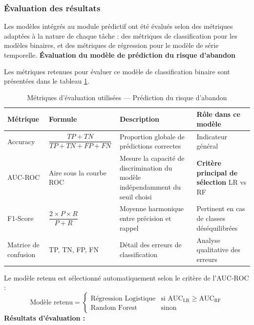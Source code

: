 \subsubsection{Évaluation des résultats}
Les modèles intégrés au module prédictif ont été évalués selon des métriques adaptées à la nature de chaque tâche : des métriques de classification pour les modèles binaires, et des métriques de régression pour le modèle de série temporelle.
\vspace{0.3cm}
\noindent\textbf{Évaluation du modèle de prédiction du risque d'abandon }

\noindent Les métriques retenues pour évaluer ce modèle de classification binaire sont présentées dans le tableau \ref{tab:metriques_abandon}.

\begin{table}[H]
\centering
\caption{Métriques d'évaluation utilisées — Prédiction du risque d'abandon}
\label{tab:metriques_abandon}
\begin{tabular}{|l|p{4cm}|p{4cm}|p{3.5cm}|}
\hline
\textbf{Métrique} & \textbf{Formule} & \textbf{Description} & \textbf{Rôle dans ce modèle} \\
\hline
Accuracy & $\dfrac{TP + TN}{TP + TN + FP + FN}$ & Proportion globale de prédictions correctes & Indicateur général \\
\hline
AUC-ROC & Aire sous la courbe ROC & Mesure la capacité de discrimination du modèle indépendamment du seuil choisi & \textbf{Critère principal de sélection} LR vs RF \\
\hline
F1-Score & $\dfrac{2 \times P \times R}{P + R}$ & Moyenne harmonique entre précision et rappel & Pertinent en cas de classes déséquilibrées \\
\hline
Matrice de confusion & TP, TN, FP, FN & Détail des erreurs de classification & Analyse qualitative des erreurs \\
\hline
\end{tabular}
\end{table}

\noindent Le modèle retenu est sélectionné automatiquement selon le critère de l'AUC-ROC :
\[
\text{Modèle retenu} =
\begin{cases}
\text{Régression Logistique} & \text{si } \text{AUC}_{\text{LR}} \geq \text{AUC}_{\text{RF}} \\
\text{Random Forest} & \text{sinon}
\end{cases}
\]
 \noindent\textbf{Résultats d'évaluation :}

